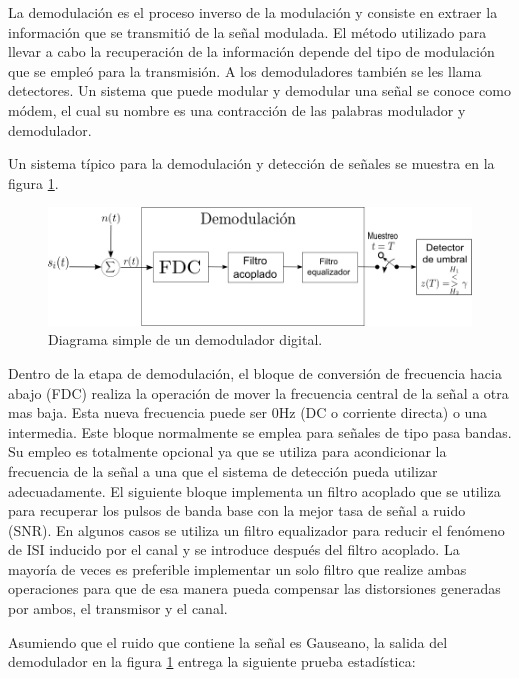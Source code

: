 La demodulaci\'on es el proceso inverso de la modulaci\'on y consiste en
extraer la informaci\'on que se transmiti\'o de la se\~nal modulada. El m\'etodo
utilizado para llevar a cabo la recuperaci\'on de la informaci\'on depende del
tipo de modulaci\'on que se emple\'o para la transmisi\'on. A los demoduladores
tambi\'en se les llama detectores. Un sistema que puede modular y demodular una
se\~nal se conoce como m\'odem, el cual su nombre es una contracci\'on de las
palabras modulador y demodulador. 

Un sistema t\'ipico para la demodulaci\'on y detecci\'on de se\~nales se muestra en la
figura \ref{fig:simpledemod}. 

\begin{figure}[tp]
\centering
	\includegraphics[scale=0.5]{figs/simpledemod}
	\vspace{0.3in}
	\caption{Diagrama simple de un demodulador digital.}
	\label{fig:simpledemod}
\end{figure}

Dentro de la etapa de demodulaci\'on, el bloque de conversi\'on de frecuencia hacia abajo (FDC)
realiza la operaci\'on de mover la frecuencia central de la se\~nal a otra mas baja. Esta nueva
frecuencia puede ser 0Hz (DC o corriente directa) o una intermedia. Este bloque normalmente se emplea para se\~nales de
tipo pasa bandas. Su empleo es totalmente opcional ya que se utiliza para acondicionar la frecuencia
de la se\~nal a una que el sistema de detecci\'on pueda utilizar adecuadamente. El siguiente bloque
implementa un filtro acoplado que se utiliza para recuperar los pulsos de banda base con la mejor
tasa de se\~nal a ruido (SNR). En algunos casos se utiliza un filtro equalizador para reducir el
fen\'omeno de ISI inducido por el canal y se introduce despu\'es del filtro acoplado. La mayor\'ia de
veces es preferible implementar un solo filtro que realize ambas operaciones para que de esa manera
pueda compensar las distorsiones generadas por ambos, el transmisor y el canal.

Asumiendo que el ruido que contiene la se\~nal es Gauseano, la salida del demodulador en la figura
\ref{fig:simpledemod} entrega la siguiente prueba estad\'istica:

